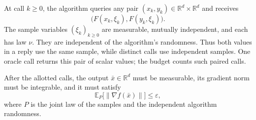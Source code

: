 \documentclass[10pt]{article}
\theoremstyle{definition}
\begin{document}
At call $k\geq0$, the algorithm queries any pair $(x_k,y_k)\in\mathbb{R}^d\times\mathbb{R}^d$ and receives
\[
\bigl(F(x_k,\xi_k),F(y_k,\xi_k)\bigr).
\]
The sample variables $(\xi_k)_{k\geq0}$ are measurable, mutually independent, and each has law $\nu$. They are independent of the algorithm's randomness. Thus both values in a reply use the same sample, while distinct calls use independent samples. One oracle call returns this pair of scalar values; the budget counts such paired calls.

After the allotted calls, the output $\bar{x}\in\mathbb{R}^d$ must be measurable, its gradient norm must be integrable, and it must satisfy
\[
\mathbb{E}_{P}\bigl[\|\nabla f(\bar{x})\|\bigr]\leq\varepsilon,
\]
where $P$ is the joint law of the samples and the independent algorithm randomness.
\end{document}

